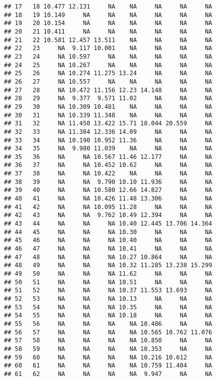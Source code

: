 \documentclass{article}\usepackage[]{graphicx}\usepackage[]{color}
\makeatletter
\newenvironment{kframe}{%
 \def\at@end@of@kframe{}%
 \ifinner\ifhmode%
  \def\at@end@of@kframe{\end{minipage}}%
  \begin{minipage}{\columnwidth}%
 \fi\fi%
 \def\FrameCommand##1{\hskip\@totalleftmargin \hskip-\fboxsep
 \colorbox{shadecolor}{##1}\hskip-\fboxsep
     \hskip-\linewidth \hskip-\@totalleftmargin \hskip\columnwidth}%
 \MakeFramed {\advance\hsize-\width
   \@totalleftmargin\z@ \linewidth\hsize
   \@setminipage}}%
 {\par\unskip\endMakeFramed%
 \at@end@of@kframe}
\newenvironment{knitrout}{}{} %
\makeatother
\begin{document}
\begin{knitrout}
\begin{kframe}
\begin{verbatim}
## 17   18 10.477 12.131     NA    NA     NA     NA     NA
## 18   19 10.149     NA     NA    NA     NA     NA     NA
## 19   20 10.154     NA     NA    NA     NA     NA     NA
## 20   21 10.411     NA     NA    NA     NA     NA     NA
## 21   22 10.581 12.457 13.511    NA     NA     NA     NA
## 22   23     NA  9.117 10.001    NA     NA     NA     NA
## 23   24     NA 10.597     NA    NA     NA     NA     NA
## 24   25     NA 10.267     NA    NA     NA     NA     NA
## 25   26     NA 10.274 11.275 13.24     NA     NA     NA
## 26   27     NA 10.557     NA    NA     NA     NA     NA
## 27   28     NA 10.472 11.156 12.23 14.148     NA     NA
## 28   29     NA  9.377  9.571 11.02     NA     NA     NA
## 29   30     NA 10.309 10.481    NA     NA     NA     NA
## 30   31     NA 10.339 11.348    NA     NA     NA     NA
## 31   32     NA 11.450 13.422 15.71 18.044 20.559     NA
## 32   33     NA 11.304 12.336 14.09     NA     NA     NA
## 33   34     NA 10.190 10.952 11.36     NA     NA     NA
## 34   35     NA  9.980 11.039    NA     NA     NA     NA
## 35   36     NA     NA 10.567 11.46 12.177     NA     NA
## 36   37     NA     NA 10.452 10.62     NA     NA     NA
## 37   38     NA     NA 10.422    NA     NA     NA     NA
## 38   39     NA     NA  9.790 10.10 11.936     NA     NA
## 39   40     NA     NA 10.580 12.66 14.827     NA     NA
## 40   41     NA     NA 10.426 11.48 13.306     NA     NA
## 41   42     NA     NA 10.095 11.28     NA     NA     NA
## 42   43     NA     NA  9.762 10.49 12.394     NA     NA
## 43   44     NA     NA     NA 10.40 12.445 13.706 14.364
## 44   45     NA     NA     NA 10.30     NA     NA     NA
## 45   46     NA     NA     NA 10.40     NA     NA     NA
## 46   47     NA     NA     NA 10.41     NA     NA     NA
## 47   48     NA     NA     NA 10.27 10.864     NA     NA
## 48   49     NA     NA     NA 10.32 11.285 13.238 15.299
## 49   50     NA     NA     NA 11.62     NA     NA     NA
## 50   51     NA     NA     NA 10.51     NA     NA     NA
## 51   52     NA     NA     NA 10.37 11.553 13.693     NA
## 52   53     NA     NA     NA 10.13     NA     NA     NA
## 53   54     NA     NA     NA 10.35     NA     NA     NA
## 54   55     NA     NA     NA 10.18     NA     NA     NA
## 55   56     NA     NA     NA    NA 10.486     NA     NA
## 56   57     NA     NA     NA    NA 10.565 10.762 11.076
## 57   58     NA     NA     NA    NA 10.850     NA     NA
## 58   59     NA     NA     NA    NA 10.353     NA     NA
## 59   60     NA     NA     NA    NA 10.216 10.612     NA
## 60   61     NA     NA     NA    NA 10.759 11.404     NA
## 61   62     NA     NA     NA    NA  9.947     NA     NA

\end{verbatim}
\end{kframe}
\end{knitrout}
\end{document}
